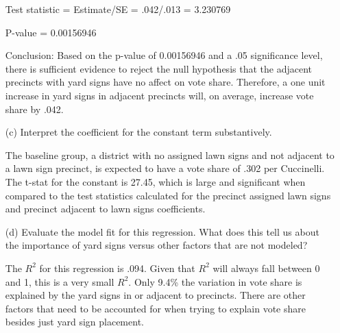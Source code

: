 \documentclass[12pt,letterpaper]{article}
\begin{document}
\begin{enumerate}
				\vspace{.25cm}			
	Test statistic = Estimate/SE = .042/.013 = 3.230769
	
	P-value = 0.00156946
	
		
	
	\newpage
	
	Conclusion: Based on the p-value of 0.00156946 and a .05 significance level, there is sufficient evidence to reject the null hypothesis that the adjacent precincts with yard signs have no affect on vote share. Therefore, a one unit increase in yard signs in adjacent precincts will, on average, increase vote share by .042.
	
	
	\vspace{1cm}
	\item [(c)] Interpret the coefficient for the constant term substantively.
	\vspace{.5cm}
	
	The baseline group, a district with no assigned lawn signs and not adjacent to a lawn sign precinct, is expected to have a vote share of .302 per Cuccinelli. The t-stat for the constant is 27.45, which is large and significant when compared to the test statistics calculated for the precinct assigned lawn signs and precinct adjacent to lawn signs coefficients. 
			
	
	\vspace{1cm}
	\item [(d)] Evaluate the model fit for this regression.  What does this	tell us about the importance of yard signs versus other factors that are not modeled?
	
	The $R^2$ for this regression is .094. Given that $R^2$ will always fall between 0 and 1, this is a very small $R^2$. Only 9.4\% the variation in vote share is explained by the yard signs in or adjacent to precincts. There are other factors that need to be accounted for when trying to explain vote share besides just yard sign placement. 
\end{enumerate}  
\end{document}
